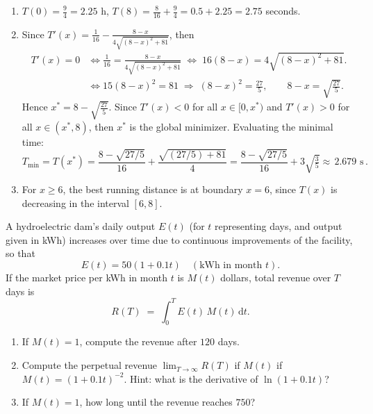 \documentclass[11pt]{exam}
\begin{document}
\begin{questions}
\begin{solution}
\begin{enumerate}[label=(\alph*)]
  \item $T(0)=\tfrac{9}{4}=2.25$ h, 
    $T(8)=\tfrac{8}{16}+\tfrac{9}{4}=0.5+2.25=2.75$ seconds.
  \item Since $T'(x)=\frac1{16}-\frac{8-x}{4\sqrt{(8-x)^2+81}}$, then  
  \begin{align*}
        T'(x)=0 &\Longleftrightarrow 
        \frac1{16}=\frac{8-x}{4\sqrt{(8-x)^2+81}}
        \;\Longleftrightarrow\;
        16(8-x)=4\sqrt{(8-x)^2+81}. \\
        &\Longleftrightarrow
        15(8-x)^2=81
        \;\Longrightarrow\;
        (8-x)^2=\frac{27}{5},
        \qquad
        8-x=\sqrt{\tfrac{27}{5}}.
  \end{align*}
    Hence $x^* = 8-\sqrt{\tfrac{27}{5}}$. Since $T'(x) < 0$ for all $x \in [0, x^*)$ and $T'(x) > 0$ for all $x \in (x^*, 8)$, then $x^*$ is the global minimizer. Evaluating the minimal time:
    $$
    T_{\min}=T(x^*)=\frac{8-\sqrt{27/5}}{16}
              +\frac{\sqrt{(27/5)+81}}{4}
            =\frac{8-\sqrt{27/5}}{16}
              +3\sqrt{\tfrac{3}{5}}
            \approx \boxed{\,2.679\text{ s}\,}.
    $$
  \item For $x\ge6$, the best running distance is at boundary $x=6$, since $T(x)$ is decreasing in the interval $[6, 8]$.
\end{enumerate}
\end{solution}

\question[2]
A hydroelectric dam’s daily output $E(t)$ (for $t$ representing days, and output given in kWh) increases over time due to continuous improvements of the facility, so that
\[
E(t) = 50(1+ 0.1t)
\quad(\text{kWh in month }t).
\]
If the market price per kWh in month \(t\) is \(M(t)\) dollars, total revenue over \(T\) days is
\[
R(T) \;=\; \int_{0}^{T} E(t)\,M(t)\,\mathrm{d}t.
\]
\begin{enumerate}[label=(\alph*)]
  \item If \(M(t)=1\), compute the revenue after \(120\) days.
  \item Compute the perpetual revenue \(\displaystyle\lim_{T\to\infty}R(T)\) if \(M(t)\) if $M(t) = (1+ 0.1t)^{-2}$. Hint: what is the derivative of $\ln(1 + 0.1t)$?
  \item If \(M(t)=1\), how long until the revenue reaches \(750\)?
\end{enumerate}


\end{questions}
\end{document}
